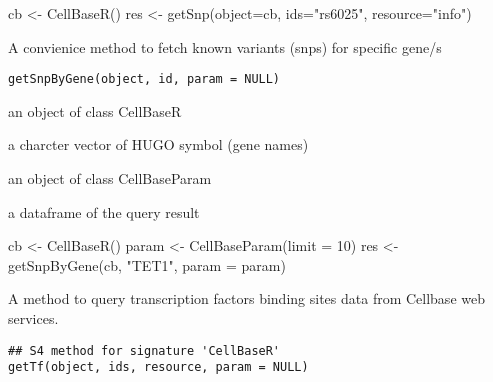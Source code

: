 \documentclass[letterpaper]{book}
\begin{document}
%
\begin{Examples}
\begin{ExampleCode}
cb <- CellBaseR()
res <- getSnp(object=cb, ids="rs6025", resource="info")
\end{ExampleCode}
\end{Examples}
%
\begin{Description}\relax
A convienice method to fetch known variants (snps) for specific gene/s
\end{Description}
%
\begin{Usage}
\begin{verbatim}
getSnpByGene(object, id, param = NULL)
\end{verbatim}
\end{Usage}
%
\begin{Arguments}
\begin{ldescription}
\item[\code{object}] an object of class CellBaseR

\item[\code{id}] a charcter vector of HUGO symbol (gene names)

\item[\code{param}] an object of class CellBaseParam
\end{ldescription}
\end{Arguments}
%
\begin{Value}
a dataframe of the query result
\end{Value}
%
\begin{Examples}
\begin{ExampleCode}
cb <- CellBaseR()
param <- CellBaseParam(limit = 10)
res <- getSnpByGene(cb, "TET1", param = param)
\end{ExampleCode}
\end{Examples}
%
\begin{Description}\relax
A method to query transcription factors binding sites data from Cellbase web
services.
\end{Description}
%
\begin{Usage}
\begin{verbatim}
## S4 method for signature 'CellBaseR'
getTf(object, ids, resource, param = NULL)
\end{verbatim}
\end{Usage}
%
\end{document}
